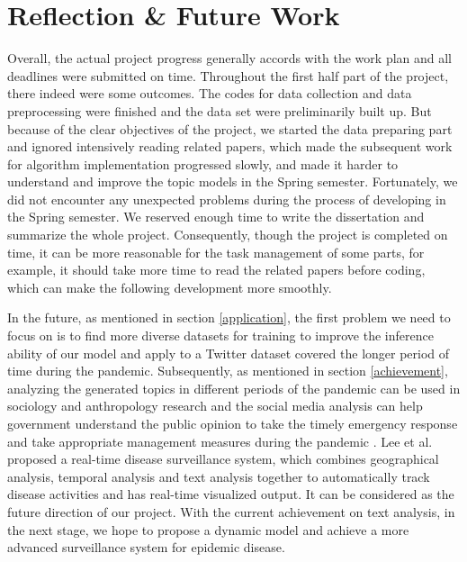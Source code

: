 \section{Reflection \& Future Work}

Overall, the actual project progress generally accords with the work plan and all deadlines were submitted on time. Throughout the first half part of the project, there indeed were some outcomes. The codes for data collection and data preprocessing were finished and the data set were preliminarily built up. But because of the clear objectives of the project, we started the data preparing part and ignored intensively reading related papers, which made the subsequent work for algorithm implementation progressed slowly, and made it harder to understand and improve the topic models in the Spring semester. Fortunately, we did not encounter any unexpected problems during the process of developing in the Spring semester. We reserved enough time to write the dissertation and summarize the whole project. Consequently, though the project is completed on time, it can be more reasonable for the task management of some parts, for example, it should take more time to read the related papers before coding, which can make the following development more smoothly.

In the future, as mentioned in section \ref{application}, the first problem we need to focus on is to find more diverse datasets for training to improve the inference ability of our model and apply to a Twitter dataset covered the longer period of time during the pandemic. Subsequently, as mentioned in section \ref{achievement}, analyzing the generated topics in different periods of the pandemic can be used in sociology and anthropology research and the social media analysis can help government understand the public opinion to take the timely emergency response and take appropriate management measures during the pandemic \cite{han2020using}. Lee et al. \cite{lee2013real} proposed a real-time disease surveillance system, which combines geographical analysis, temporal analysis and text analysis together to automatically track disease activities and has real-time visualized output. It can be considered as the future direction of our project. With the current achievement on text analysis, in the next stage, we hope to propose a dynamic model and achieve a more advanced surveillance system for epidemic disease. 
